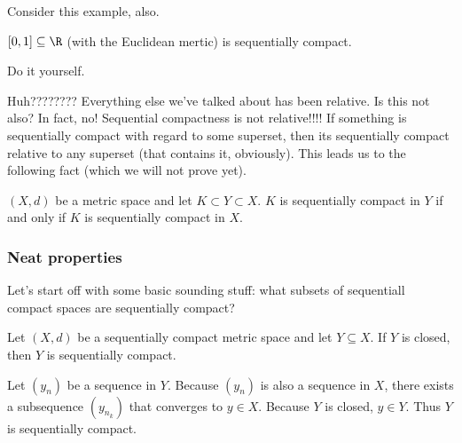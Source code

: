 \documentclass[class=article, crop=false]{standalone}
\begin{document}
Consider this example, also.
\begin{ex}
    $[0,1] \subseteq \R$ (with the Euclidean mertic) is sequentially compact.
\end{ex}
\begin{pf}
    Do it yourself.
\end{pf}
Huh???????? Everything else we've talked about has been relative. Is this not also? In fact, no! Sequential compactness is not relative!!!! If something is sequentially compact with regard to some superset, then its sequentially compact relative to any superset (that contains it, obviously). This leads us to the following fact (which we will not prove yet).
\begin{fact}
    $(X,d)$ be a metric space and let $K \subset Y \subset X$. $K$ is sequentially compact in $Y$ if and only if $K$ is sequentially compact in $X$.
\end{fact}



\subsubsection*{Neat properties}

Let's start off with some basic sounding stuff: what subsets of sequentiall compact spaces are sequentially compact?
\begin{thm}
    Let $(X,d)$ be a sequentially compact metric space and let $Y \subseteq X$. If $Y$ is closed, then $Y$ is sequentially compact.
\end{thm}
\begin{pf}
    Let $(y_n)$ be a sequence in $Y$. Because $(y_n)$ is also a sequence in $X$, there exists a subsequence $(y_{n_k})$ that converges to $y \in X$. Because $Y$ is closed, $y \in Y$. Thus $Y$ is sequentially compact.
\end{pf}
\end{document}
